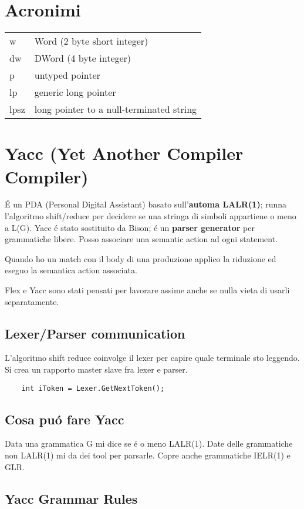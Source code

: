 \chapter{Acronimi}
\begin{tabular}{ll}
    w       &   Word (2 byte short integer)\\
    dw      &   DWord (4 byte integer)\\
    p       &   untyped pointer\\
    lp      &   generic long pointer\\
    lpsz    &   long pointer to a null-terminated string\\
\end{tabular}

\chapter{Yacc (Yet Another Compiler Compiler)}
\'E un PDA (Personal Digital Assistant) basato sull'\textbf{automa LALR(1)}; 
runna l'algoritmo shift/reduce per decidere se una stringa di simboli appartiene o meno
a L(G). Yacc \'e stato sostituito da Bison; \'e un \textbf{parser generator} per grammatiche 
libere. Posso associare una semantic action ad ogni statement.

Quando ho un match con il body di una produzione applico la riduzione ed 
eseguo la semantica action associata.

Flex e Yacc sono stati pensati per lavorare assime anche se nulla vieta di 
usarli separatamente. 

\section{Lexer/Parser communication}
L'algoritmo shift reduce coinvolge il lexer per capire quale terminale sto 
leggendo. Si crea un rapporto master slave fra lexer e parser.

\begin{lstlisting}
    int iToken = Lexer.GetNextToken();  
\end{lstlisting}

\section{Cosa pu\'o fare Yacc}
Data una grammatica G mi dice se \'e o meno LALR(1). Date delle grammatiche non LALR(1) mi da dei tool per parsarle.
Copre anche grammatiche IELR(1) e GLR.

\section{Yacc Grammar Rules}

